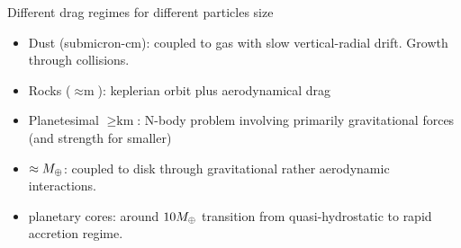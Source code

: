 \begin{frame}{Different drag regimes for different particles size}
\begin{itemize}
\item Dust (submicron-cm): coupled to gas with slow vertical-radial drift. Growth through collisions.
\item Rocks ($\approx\si{\meter}$): keplerian orbit plus aerodynamical drag
\item Planetesimal $\geq\si{\kilo\meter}$: N-body problem involving primarily gravitational forces (and strength for smaller)
\item $\approx M_{\oplus}$: coupled to disk through gravitational rather aerodynamic interactions.
\item planetary cores: around $10M_{\oplus}$ transition from quasi-hydrostatic to rapid accretion regime.
\end{itemize}
\end{frame}

